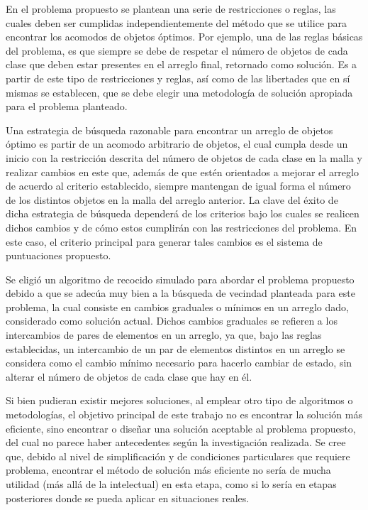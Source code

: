 En el problema propuesto se plantean una serie de restricciones o reglas, las cuales deben ser cumplidas independientemente del método que se utilice para encontrar los acomodos de objetos óptimos.
Por ejemplo, una de las reglas básicas del problema, es que siempre se debe de respetar el número de objetos de cada clase que deben estar presentes en el arreglo final, retornado como solución.
Es a partir de este tipo de restricciones y reglas, así como de las libertades que en sí mismas se establecen, que se debe elegir una metodología de solución apropiada para el problema planteado.

Una estrategia de búsqueda razonable para encontrar un arreglo de objetos óptimo es partir de un acomodo arbitrario de objetos, el cual cumpla desde un inicio con la restricción descrita del número de objetos de cada clase en la malla y realizar cambios en este que, además de que estén orientados a mejorar el arreglo de acuerdo al criterio establecido, siempre mantengan de igual forma el número de los distintos objetos en la malla del arreglo anterior.
La clave del éxito de dicha estrategia de búsqueda dependerá de los criterios bajo los cuales se realicen dichos cambios y de cómo estos cumplirán con las restricciones del problema.
En este caso, el criterio principal para generar tales cambios es el sistema de puntuaciones propuesto.

Se eligió un algoritmo de recocido simulado para abordar el problema propuesto debido a que se adecúa muy bien a la búsqueda de vecindad planteada para este problema, la cual consiste en cambios graduales o mínimos en un arreglo dado, considerado como solución actual.
Dichos cambios graduales se refieren a los intercambios de pares de elementos en un arreglo, ya que, bajo las reglas establecidas, un intercambio de un par de elementos distintos en un arreglo se considera como el cambio mínimo necesario para hacerlo cambiar de estado, sin alterar el número de objetos de cada clase que hay en él.

Si bien pudieran existir mejores soluciones, al emplear otro tipo de algoritmos o metodologías, el objetivo principal de este trabajo no es encontrar la solución más eficiente, sino encontrar o diseñar una solución aceptable al problema propuesto, del cual no parece haber antecedentes según la investigación realizada.
Se cree que, debido al nivel de simplificación y de condiciones particulares que requiere problema, encontrar el método de solución más eficiente no sería de mucha utilidad (más allá de la intelectual) en esta etapa, como si lo sería en etapas posteriores donde se pueda aplicar en situaciones reales.

